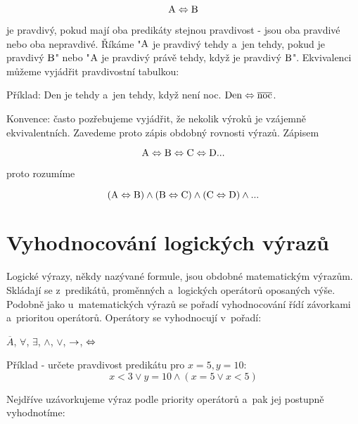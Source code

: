 \begin{equation}
\mathrm{A} \Leftrightarrow \mathrm{B} 
\end{equation}

je pravdivý, pokud mají oba predikáty stejnou pravdivost - jsou oba pravdivé nebo oba nepravdivé. Říkáme "\(\mathrm{A}\) je pravdivý tehdy a~jen tehdy, pokud je pravdivý \(\mathrm{B}\)" nebo "\(\mathrm{A}\) je pravdivý právě tehdy, když je pravdivý \(\mathrm{B}\)".
Ekvivalenci můžeme vyjádřit pravdivostní tabulkou:


Příklad: Den je tehdy a~jen tehdy, když není noc. \(\mathrm{Den} \Leftrightarrow \overline{\mathrm{noc}}\).

Konvence: často pozřebujeme vyjádřit, že nekolik výroků je vzájemně ekvivalentních. Zavedeme proto zápis obdobný rovnosti výrazů. Zápisem

\begin{equation}
\mathrm{A} \Leftrightarrow \mathrm{B} \Leftrightarrow \mathrm{C} \Leftrightarrow \mathrm{D} ... 
\end{equation}

proto rozumíme

\begin{equation}
(\mathrm{A} \Leftrightarrow \mathrm{B}) \land (\mathrm{B} \Leftrightarrow \mathrm{C}) \land (\mathrm{C} \Leftrightarrow \mathrm{D}) \land ... 
\end{equation}

\section{Vyhodnocování logických výrazů}

Logické výrazy, někdy nazývané formule, jsou obdobné matematickým výrazům. Skládají se z~predikátů, proměnných a~logických operátorů oposaných výše. Podobně jako u~matematických výrazů se pořadí vyhodnocování řídí závorkami a~prioritou operátorů. Operátory se vyhodnocují v~pořadí:

\(\overline{A}\), \(\forall\), \(\exists\), \(\land\), \(\lor\), \(\rightarrow\), \(\Leftrightarrow\)

Příklad - určete pravdivost predikátu pro \(x = 5, y = 10\):
\begin{equation}
x < 3 \lor y = 10 \land (x = 5 \lor x < 5)
\end{equation}

Nejdříve uzávorkujeme výraz podle priority operátorů a~pak jej postupně vyhodnotíme:


